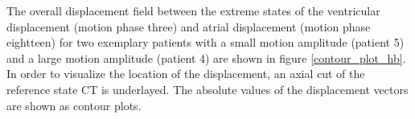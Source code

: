 \newpage

The overall displacement field between the extreme states of the ventricular displacement (motion phase three) and atrial displacement 
(motion phase eightteen) for two exemplary patients with a small motion amplitude (patient 5) and a large motion amplitude (patient 4) are 
shown in figure \ref{contour_plot_hb}. In order to visualize the location of the displacement, an axial cut of the reference state CT is 
underlayed. The absolute values of the displacement vectors are shown as contour plots. 

\begin{figure}[H]
\end{figure}
